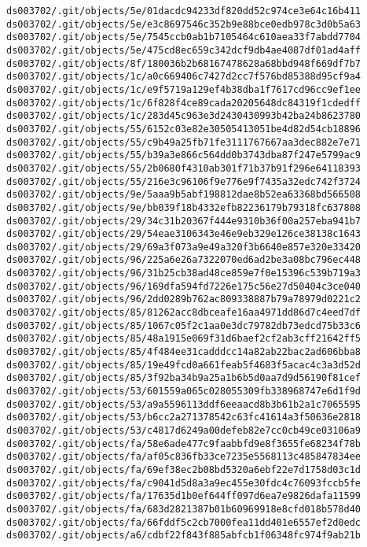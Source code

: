 \documentclass[11pt]{article}
\begin{document}
\begin{Verbatim}[commandchars=\\\{\}]
ds003702/.git/objects/5e/01dacdc94233df820dd52c974ce3e64c16b411
ds003702/.git/objects/5e/e3c8697546c352b9e88bce0edb978c3d0b5a63
ds003702/.git/objects/5e/7545ccb0ab1b7105464c610aea33f7abdd7704
ds003702/.git/objects/5e/475cd8ec659c342dcf9db4ae4087df01ad4aff
ds003702/.git/objects/8f/180036b2b68167478628a68bbd948f669df7b7
ds003702/.git/objects/1c/a0c669406c7427d2cc7f576bd85388d95cf9a4
ds003702/.git/objects/1c/e9f5719a129ef4b38dba1f7617cd96cc9ef1ee
ds003702/.git/objects/1c/6f828f4ce89cada20205648dc84319f1cdedff
ds003702/.git/objects/1c/283d45c963e3d2430430993b42ba24b8623780
ds003702/.git/objects/55/6152c03e82e30505413051be4d82d54cb18896
ds003702/.git/objects/55/c9b49a25fb71fe3111767667aa3dec882e7e71
ds003702/.git/objects/55/b39a3e866c564dd0b3743dba87f247e5799ac9
ds003702/.git/objects/55/2b0680f4310ab301f71b37b91f296e64118393
ds003702/.git/objects/55/216e3c96106f9e776e9f7435a32edc742f3724
ds003702/.git/objects/9e/5aaa9b5abf198812dae8b52ea63368bd566508
ds003702/.git/objects/9e/bb039f18b4332efb82236179b79318fc637808
ds003702/.git/objects/29/34c31b20367f444e9310b36f00a257eba941b7
ds003702/.git/objects/29/54eae3106343e46e9eb329e126ce38138c1643
ds003702/.git/objects/29/69a3f073a9e49a320f3b6640e857e320e33420
ds003702/.git/objects/96/225a6e26a7322070ed6ad2be3a08bc796ec448
ds003702/.git/objects/96/31b25cb38ad48ce859e7f0e15396c539b719a3
ds003702/.git/objects/96/169dfa594fd7226e175c56e27d50404c3ce040
ds003702/.git/objects/96/2dd0289b762ac809338887b79a78979d0221c2
ds003702/.git/objects/85/81262acc8dbceafe16aa4971dd86d7c4eed7df
ds003702/.git/objects/85/1067c05f2c1aa0e3dc79782db73edcd75b33c6
ds003702/.git/objects/85/48a1915e069f31d6baef2cf2ab3cff21642ff5
ds003702/.git/objects/85/4f484ee31cadddcc14a82ab22bac2ad606bba8
ds003702/.git/objects/85/19e49fcd0a661feab5f4683f5acac4c3a3d52d
ds003702/.git/objects/85/3f92ba34b9a25a1b6b5d0aa7d9d56190f81cef
ds003702/.git/objects/53/601559a065c028055309fb338968747e6d1f9d
ds003702/.git/objects/53/a9a5596113ddf6eeaacd8b3b61b2a1c7065595
ds003702/.git/objects/53/b6cc2a271378542c63fc41614a3f50636e2818
ds003702/.git/objects/53/c4817d6249a00defeb82e7cc0cb49ce03106a9
ds003702/.git/objects/fa/58e6ade477c9faabbfd9e8f3655fe68234f78b
ds003702/.git/objects/fa/af05c836fb33ce7235e5568113c485847834ee
ds003702/.git/objects/fa/69ef38ec2b08bd5320a6ebf22e7d1758d03c1d
ds003702/.git/objects/fa/c9041d5d8a3a9ec455e30fdc4c76093fccb5fe
ds003702/.git/objects/fa/17635d1b0ef644ff097d6ea7e9826dafa11599
ds003702/.git/objects/fa/683d2821387b01b60969918e8cfd018b578d40
ds003702/.git/objects/fa/66fddf5c2cb7000fea11dd401e6557ef2d0edc
ds003702/.git/objects/a6/cdbf22f843f885abfcb1f06348fc974f9ab21b

\end{Verbatim}
\end{document}
